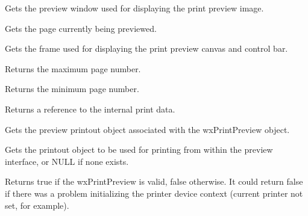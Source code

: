 \label{wxprintpreviewgetcanvas}


Gets the preview window used for displaying the print preview image.

\label{wxprintpreviewgetcurrentpage}


Gets the page currently being previewed.

\label{wxprintpreviewgetframe}


Gets the frame used for displaying the print preview canvas
and control bar.

\label{wxprintpreviewgetmaxpage}


Returns the maximum page number.

\label{wxprintpreviewgetminpage}


Returns the minimum page number.

\label{wxprintpreviewgetprintdata}


Returns a reference to the internal print data.

\label{wxprintpreviewgetprintout}


Gets the preview printout object associated with the wxPrintPreview object.

\label{wxprintpreviewgetprintoutforprinting}


Gets the printout object to be used for printing from within the preview interface,
or NULL if none exists.

\label{wxprintpreviewok}


Returns true if the wxPrintPreview is valid, false otherwise. It could return false if there was a
problem initializing the printer device context (current printer not set, for example).

